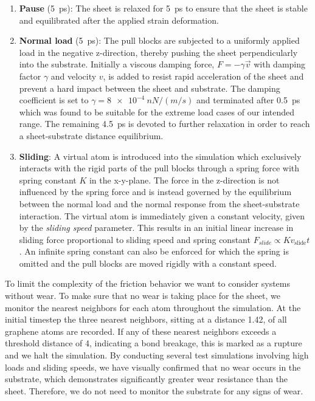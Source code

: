 \begin{enumerate}
  \item \textbf{Pause} (\SI{5}{ps}): The sheet is relaxed for \SI{5}{ps} to ensure that the sheet is stable and equilibrated after the applied strain deformation. 
  \item \textbf{Normal load} (\SI{5}{ps}): The pull blocks are subjected to a uniformly applied load in the negative z-direction, thereby pushing the sheet perpendicularly into the substrate. Initially a viscous damping force, $F = -\gamma \vec{v}$ with damping factor $\gamma$ and velocity $v$, is added to resist rapid acceleration of the sheet and prevent a hard impact between the sheet and substrate. The damping coefficient is set to $\gamma = \SI{8e-4}{nN/(m/s)}$ and terminated after \SI{0.5}{ps} which was found to be suitable for the extreme load cases of our intended range. The remaining \SI{4.5}{ps} is devoted to further relaxation in order to reach a sheet-substrate distance equilibrium.
  \item \textbf{Sliding}: A virtual atom is introduced into the simulation which
  exclusively interacts with the rigid parts of the pull blocks through a spring force with spring constant $K$ in the x-y-plane. The force in the z-direction is not influenced by the spring force and is instead governed by the equilibrium between the normal load and the normal response from the sheet-substrate interaction. The virtual atom is immediately given a constant velocity, given by the \textit{sliding speed} parameter. This results in an initial linear increase in sliding force proportional to sliding speed and spring constant $F_{\textit{slide}} \propto Kv_{\text{slide}}t$. An infinite spring constant can also be enforced for which the spring is omitted and the pull blocks are moved rigidly with a constant speed.
\end{enumerate}
To limit the complexity of the friction behavior we want to consider systems without wear. To make sure that no wear is taking place for the sheet, we monitor the nearest neighbors for each atom throughout the simulation. At the initial timestep the three nearest neighbors, sitting at a distance \SI{1.42}{}, of all graphene atoms are recorded. If any of these nearest neighbors exceeds a threshold distance of \SI{4}{}, indicating a bond breakage, this is marked as a rupture and we halt the simulation. By conducting several test simulations involving high loads and sliding speeds, we have visually confirmed that no wear occurs in the substrate, which demonstrates significantly greater wear resistance than the sheet. Therefore, we do not need to monitor the substrate for any signs of wear.



